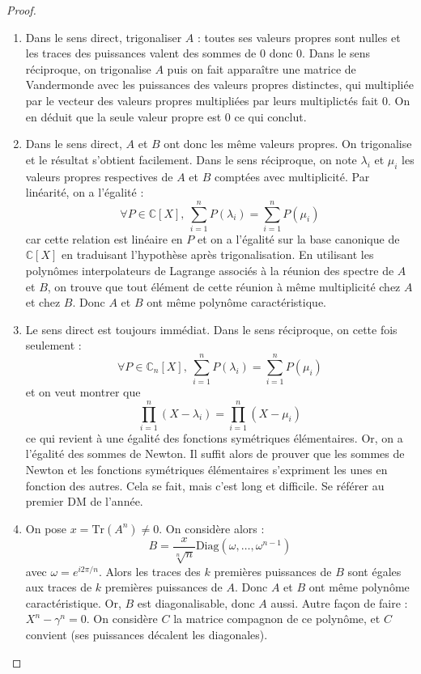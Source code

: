 \documentclass[french,a4paper]{article}
\newcommand{\C}{\mathbb{C}}
\newcommand{\Tr}{\text{Tr}}
\theoremstyle{plain}
\theoremstyle{definition}
\theoremstyle{remark}
\begin{document}
\begin{proof}
	\begin{enumerate}
		\item Dans le sens direct, trigonaliser $A$ : toutes ses valeurs propres sont nulles et les traces des puissances valent des sommes de $0$ donc $0$. Dans le sens réciproque, on trigonalise $A$ puis on fait apparaître une matrice de Vandermonde avec les puissances des valeurs propres distinctes, qui multipliée par le vecteur des valeurs propres multipliées par leurs multiplictés fait $0$. On en déduit que la seule valeur propre est $0$ ce qui conclut.
		\item Dans le sens direct, $A$ et $B$ ont donc les même valeurs propres. On trigonalise et le résultat s'obtient facilement. Dans le sens réciproque, on note $\lambda_i$ et $\mu_i$ les valeurs propres respectives de $A$ et $B$ comptées avec multiplicité. Par linéarité, on a l'égalité : $$\forall P\in\C[X],\ \sum_{i=1}^{n}P(\lambda_i)=\sum_{i=1}^{n}P(\mu_i)$$ car cette relation est linéaire en $P$ et on a l'égalité sur la base canonique de $\C[X]$ en traduisant l'hypothèse après trigonalisation. En utilisant les polynômes interpolateurs de Lagrange associés à la réunion des spectre de $A$ et $B$, on trouve que tout élément de cette réunion à même multiplicité chez $A$ et chez $B$. Donc $A$ et $B$ ont même polynôme caractéristique.
		\item Le sens direct est toujours immédiat. Dans le sens réciproque, on cette fois seulement : $$\forall P\in\C_n[X],\ \sum_{i=1}^{n}P(\lambda_i)=\sum_{i=1}^{n}P(\mu_i)$$ et on veut montrer que $$\prod_{i=1}^{n}(X-\lambda_i)=\prod_{i=1}^{n}(X-\mu_i)$$ ce qui revient à une égalité des fonctions symétriques élémentaires. Or, on a l'égalité des sommes de Newton. Il suffit alors de prouver que les sommes de Newton et les fonctions symétriques élémentaires s'expriment les unes en fonction des autres. Cela se fait, mais c'est long et difficile. Se référer au premier DM de l'année.
		\item On pose $x=\Tr(A^n)\ne 0$. On considère alors : $$B=\frac{x}{\sqrt[n]{n}}\text{Diag}(\omega,\ldots,\omega^{n-1})$$ avec $\omega=e^{i2\pi/n}$. Alors les traces des $k$ premières puissances de $B$ sont égales aux traces de $k$ premières puissances de $A$. Donc $A$ et $B$ ont même polynôme caractéristique. Or, $B$ est diagonalisable, donc $A$ aussi. Autre façon de faire : $X^n-\gamma^n=0$. On considère $C$ la matrice compagnon de ce polynôme, et $C$ convient (ses puissances décalent les diagonales).
	\end{enumerate}
\end{proof}
\end{document}
